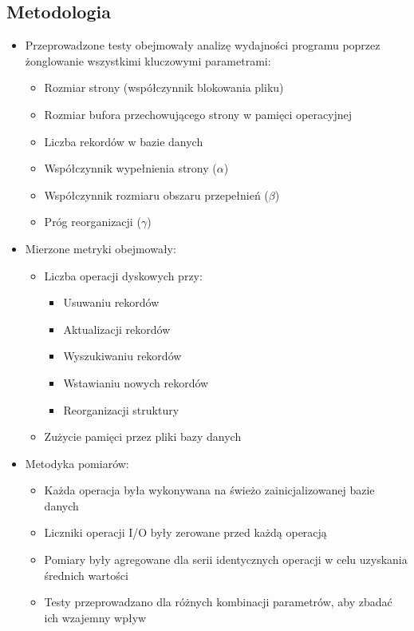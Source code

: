 \documentclass[12pt]{article}
\begin{document}
\subsection{Metodologia}
\begin{itemize}
    \item Przeprowadzone testy obejmowały analizę wydajności programu poprzez żonglowanie wszystkimi kluczowymi parametrami:
    \begin{itemize}
        \item Rozmiar strony (współczynnik blokowania pliku)
        \item Rozmiar bufora przechowującego strony w pamięci operacyjnej
        \item Liczba rekordów w bazie danych
        \item Współczynnik wypełnienia strony ($\alpha$)
        \item Współczynnik rozmiaru obszaru przepełnień ($\beta$)
        \item Próg reorganizacji ($\gamma$)
    \end{itemize}

    \item Mierzone metryki obejmowały:
    \begin{itemize}
        \item Liczba operacji dyskowych przy:
        \begin{itemize}
            \item Usuwaniu rekordów
            \item Aktualizacji rekordów
            \item Wyszukiwaniu rekordów
            \item Wstawianiu nowych rekordów
            \item Reorganizacji struktury
        \end{itemize}
        \item Zużycie pamięci przez pliki bazy danych
    \end{itemize}

    \item Metodyka pomiarów:
    \begin{itemize}
        \item Każda operacja była wykonywana na świeżo zainicjalizowanej bazie danych
        \item Liczniki operacji I/O były zerowane przed każdą operacją
        \item Pomiary były agregowane dla serii identycznych operacji w celu uzyskania średnich wartości
        \item Testy przeprowadzano dla różnych kombinacji parametrów, aby zbadać ich wzajemny wpływ
    \end{itemize}
\end{itemize}
\end{document}
